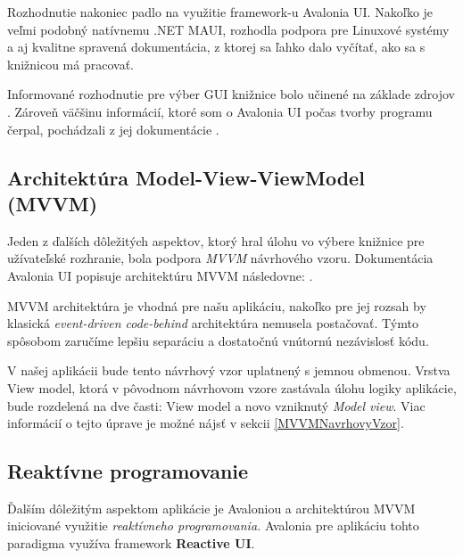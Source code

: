 Rozhodnutie nakoniec padlo na využitie framework-u Avalonia UI. Nakoľko je veľmi podobný natívnemu .NET MAUI, rozhodla podpora pre Linuxové systémy a aj kvalitne spravená dokumentácia, z ktorej sa ľahko dalo vyčítať, ako sa s knižnicou má pracovať. 

Informované rozhodnutie pre výber GUI knižnice bolo učinené na základe zdrojov \cite{WpfGuide,WhatIsMAUI,AvaloniaMauiComparison}. Zároveň väčšinu informácií, ktoré som o Avalonia UI počas tvorby programu čerpal, pochádzali z jej dokumentácie \cite{AvaloniaDokumentacia}.

\subsection{Architektúra Model-View-ViewModel (MVVM)}\label{ArchitekturaMVVM}

Jeden z ďalších dôležitých aspektov, ktorý hral úlohu vo výbere knižnice pre užívateľské rozhranie, bola podpora \textit{MVVM} návrhového vzoru. Dokumentácia Avalonia UI popisuje architektúru MVVM následovne: \cite{MVVMDefByAvalonia}.

MVVM architektúra je vhodná pre našu aplikáciu, nakoľko pre jej rozsah by klasická \textit{event-driven code-behind} architektúra nemusela postačovať. Týmto spôsobom zaručíme lepšiu separáciu a dostatočnú vnútornú nezávislosť kódu.    

V našej aplikácii bude tento návrhový vzor uplatnený s jemnou obmenou. Vrstva View model, ktorá v pôvodnom návrhovom vzore zastávala úlohu logiky aplikácie, bude rozdelená na dve časti: View model a novo vzniknutý \textit{Model view}. Viac informácií o tejto úprave je možné nájsť v sekcii \ref{MVVMNavrhovyVzor}. 

\subsection{Reaktívne programovanie}

Ďalším dôležitým aspektom aplikácie je Avaloniou a architektúrou MVVM iniciované využitie \textit{reaktívneho programovania.} Avalonia pre aplikáciu tohto paradigma využíva framework \textbf{Reactive UI}. 

